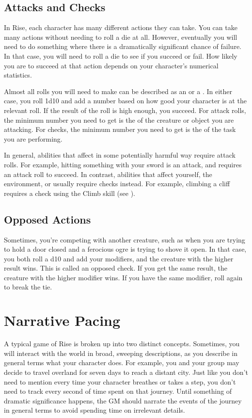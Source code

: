     \subsection{Attacks and Checks}
        In Rise, each character has many different actions they can take.
        You can take many actions without needing to roll a die at all.
        However, eventually you will need to do something where there is a dramatically significant chance of failure.
        In that case, you will need to roll a die to see if you succeed or fail.
        How likely you are to succeed at that action depends on your character's numerical statistics.

        Almost all rolls you will need to make can be described as an  or a .
        In either case, you roll 1d10 and add a number based on how good your character is at the relevant roll.
        If the result of the roll is high enough, you succeed.
        For attack rolls, the minimum number you need to get is the  of the creature or object you are attacking.
        For checks, the minimum number you need to get is the  of the task you are performing.

        In general, abilities that affect  in some potentially harmful way require attack rolls.
        For example, hitting something with your sword is an attack, and requires an attack roll to succeed.
        In contrast, abilities that affect yourself, the environment, or  usually require checks instead.
        For example, climbing a cliff requires a check using the Climb skill (see ).

    \subsection{Opposed Actions}
        Sometimes, you're competing with another creature, such as when you are trying to hold a door closed and a ferocious ogre is trying to shove it open.
        In that case, you both roll a d10 and add your modifiers, and the creature with the higher result wins.
        This is called an opposed check.
        If you get the same result, the creature with the higher modifier wins.
        If you have the same modifier, roll again to break the tie.

\section{Narrative Pacing}
    A typical game of Rise is broken up into two distinct concepts.
    Sometimes, you will interact with the world in broad, sweeping descriptions, as you describe in general terms what your character does.
    For example, you and your group may decide to travel overland for seven days to reach a distant city.
    Just like you don't need to mention every time your character breathes or takes a step, you don't need to track every second of time spent on that journey.
    Until something of dramatic significance happens, the GM should narrate the events of the journey in general terms to avoid spending time on irrelevant details.


